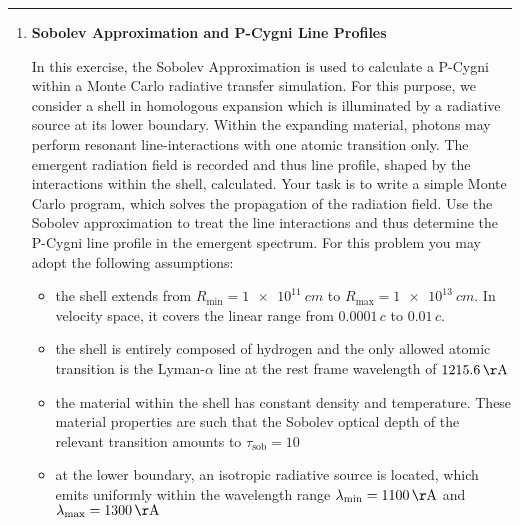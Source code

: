 \documentclass[12pt,a4paper,twoside]{article}
\begin{document}
\hrule

\begin{enumerate}
\item \textbf{Sobolev Approximation and P-Cygni Line Profiles}

  In this exercise, the Sobolev Approximation is used to calculate a P-Cygni
  within a Monte Carlo radiative transfer simulation. For this purpose, we
  consider a shell in homologous expansion which is illuminated by a radiative
  source at its lower boundary. Within the expanding material, photons may
  perform resonant line-interactions with one atomic transition only. The
  emergent radiation field is recorded and thus line profile, shaped by the
  interactions within the shell, calculated. Your task is to write a simple
  Monte Carlo program, which solves the propagation of the radiation field. Use
  the Sobolev approximation to treat the line interactions and thus determine
  the P-Cygni line profile in the emergent spectrum. For this problem you may
  adopt the following assumptions:

  \begin{itemize}
    \item the shell extends from $R_{\mathrm{min}} = \SI{1e11}{cm}$ to
      $R_{\mathrm{max}} = \SI{1e13}{cm}$. In velocity space, it covers the
      linear range from $0.0001\,c$ to $0.01 \,c$. 
    \item the shell is entirely composed of hydrogen and the only allowed atomic
      transition is the Lyman-$\alpha$ line at the rest frame wavelength of
      $1215.6\,\mathrm{\AA}$
    \item the material within the shell has constant density and temperature.
      These material properties are such that the Sobolev optical depth of the
      relevant transition amounts to $\tau_{\mathrm{sob}} = 10$
    \item at the lower boundary, an isotropic radiative source is located, which
      emits uniformly within the wavelength range $\lambda_{\mathrm{min}} = 1100
      \, \mathrm{\AA}$ and $\lambda_{\mathrm{max}} = 1300 \, \mathrm{\AA}$
  \end{itemize}


\end{enumerate}
\end{document}
